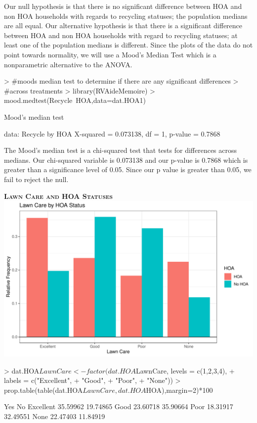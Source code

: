 \documentclass{article}
\begin{document}
Our null hypothesis is that there is no significant difference between HOA and non HOA households with regards to recycling statuses; the population medians are all equal. Our alternative hypothesis is that there is a significant difference between HOA and non HOA households with regard to recycling statuses; at least one of the population medians is different. Since the plots of the data do not point towards normality, we will use a Mood's Median Test which is a nonparametric alternative to the ANOVA.
\begin{Schunk}
\begin{Sinput}
> #moods median test to determine if there are any significant differences
> #across treatments
> library(RVAideMemoire)
> mood.medtest(Recycle~HOA,data=dat.HOA1)
\end{Sinput}
\begin{Soutput}
	Mood's median test

data:  Recycle by HOA
X-squared = 0.073138, df = 1, p-value = 0.7868
\end{Soutput}
\end{Schunk}

The Mood's median test is a chi-squared test that tests for differences across medians. Our chi-squared variable is 0.073138 and our p-value is 0.7868 which is greater than a significance level of 0.05. Since our p value is greater than 0.05, we fail to reject the null. 

\newpage
\textsc{\textbf{Lawn Care and HOA Statuses}}
\newline
\newline
\includegraphics{part2-013}

\begin{Schunk}
\begin{Sinput}
> dat.HOA$LawnCare<-factor(dat.HOA$LawnCare, levels = c(1,2,3,4),
+                         labels = c("Excellent",
+                         "Good",
+                         "Poor",
+                         "None"))
> prop.table(table(dat.HOA$LawnCare, dat.HOA$HOA),margin=2)*100
\end{Sinput}
\begin{Soutput}
                 Yes       No
  Excellent 35.59962 19.74865
  Good      23.60718 35.90664
  Poor      18.31917 32.49551
  None      22.47403 11.84919
\end{Soutput}
\end{Schunk}
\end{document}
